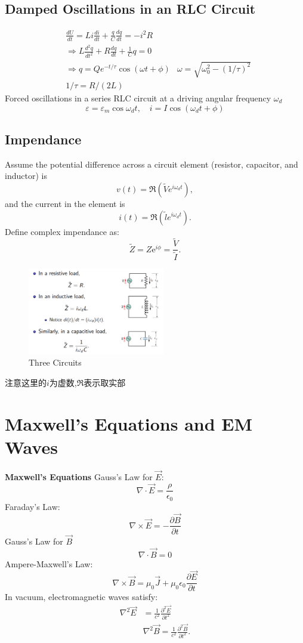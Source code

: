 \documentclass[11pt, a4paper]{article}
\begin{document}
\subsection{Damped Oscillations in an RLC Circuit}
$$\begin{aligned}
    & \frac{dU}{dt}=Li\frac{di}{dt}+\frac qC\frac{dq}{dt}=-i^2R\\
    &\Rightarrow L\frac{d^2q}{dt^2}+R\frac{dq}{dt}+\frac1Cq=0\\
    &\Rightarrow q=Qe^{-t/\tau}\cos(\omega t+\phi)
    &\omega=\sqrt{\omega_0^2-(1/\tau)^2}\\
    &1/\tau=R/(2L)
    \end{aligned}$$
Forced oscillations in a series RLC circuit at a driving
angular frequency $\omega_d$
$$\varepsilon = \varepsilon_m \cos \omega_d t, \quad i = I \cos(\omega_d t + \phi) $$    
\subsection{Impendance}
Assume the potential difference across a circuit element (resistor, capacitor, and inductor) is
$$v(t)=\Re\left(\tilde{V}e^{i\omega_dt}\right),$$
and the current in the element is
$$i(t)=\Re\left(\tilde{l}e^{i\omega_dt}\right).$$
Define complex impendance as:
$$\tilde{Z}=Z\mathrm{e}^{i\phi}=\frac{\tilde{V}}{\tilde{I}}.$$
\begin{figure}[htbp]
    \centering
    \includegraphics[width = 6cm]{Three Circuits.png}
    \caption{Three Circuits}   
\end{figure}
注意这里的$i$为虚数,$\Re$表示取实部

\section{Maxwell’s Equations and EM Waves}
\textbf{Maxwell's Equations}
Gauss's Law for $\vec{E}$:
$$\nabla \cdot \vec{E} = \frac{\rho}{\epsilon_0}$$
Faraday's Law:
$$\nabla \times \vec{E} = -\frac{\partial \vec{B}}{\partial t}$$
Gauss's Law for $\vec{B}$
$$\nabla \cdot \vec{B} = 0$$
Ampere-Maxwell's Law:
$$\nabla \times \vec{B} = \mu_0 \vec{J} + \mu_0 \epsilon_0 \frac{\partial \vec{E}}{\partial t}$$
In vacuum, electromagnetic waves satisfy:
$$\begin{aligned}\nabla^2\vec{E}&=\frac1{c^2}\frac{\partial^2\vec{E}}{\partial t^2}\\&\nabla^2\vec{B}=\frac1{c^2}\frac{\partial^2\vec{B}}{\partial t^2}.\end{aligned}$$
\end{document}
